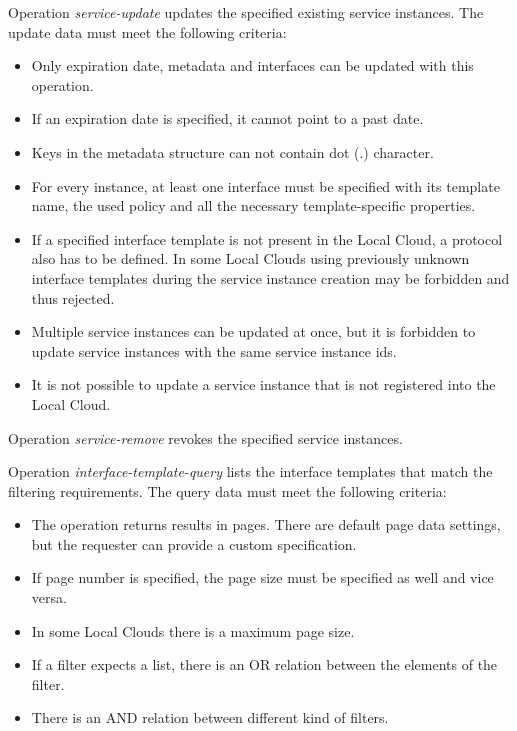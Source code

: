 \documentclass[a4paper]{arrowhead}
\begin{document}

Operation \textit{service-update} updates the specified existing service instances. The update data must meet the following criteria:

\begin{itemize}
    \item Only expiration date, metadata and interfaces can be updated with this operation.
    \item If an expiration date is specified, it cannot point to a past date.
    \item Keys in the metadata structure can not contain dot (.) character.
    \item For every instance, at least one interface must be specified with its template name, the used policy and all the necessary template-specific properties.
    \item If a specified interface template is not present in the Local Cloud, a protocol also has to be defined. In some Local Clouds using previously unknown interface templates during the service instance creation may be forbidden and thus rejected.
    \item Multiple service instances can be updated at once, but it is forbidden to update service instances with the same service instance ids.
    \item It is not possible to update a service instance that is not registered into the Local Cloud.
\end{itemize}


Operation \textit{service-remove} revokes the specified service instances.


Operation \textit{interface-template-query} lists the interface templates that match the filtering requirements. The query data must meet the following criteria:

\begin{itemize}
    \item The operation returns results in pages. There are default page data settings, but the requester can provide a custom specification.
    \item If page number is specified, the page size must be specified as well and vice versa.
    \item In some Local Clouds there is a maximum page size.
    \item If a filter expects a list, there is an OR relation between the elements of the filter.
    \item There is an AND relation between different kind of filters.
\end{itemize} 
\end{document}
